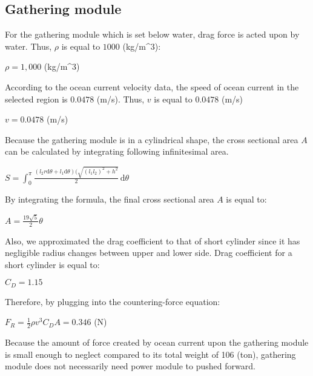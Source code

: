 \documentclass{article}
\begin{document}
\subsection{Gathering module}
For the gathering module which is set below water, drag force is acted upon by water. Thus, $\rho$ is equal to $1000$ (kg/m^3): \newline
\begin{center}
    $\rho = 1,000$ (kg/m^3)
\end{center}
\begin{flushleft}
According to the ocean current velocity data, the speed of ocean current in the selected region is $0.0478$ (m/s). Thus, $v$ is equal to $0.0478$ (m/s)
\end{flushleft}
\begin{center}
    $v = 0.0478$ (m/s)
\end{center}
\begin{flushleft}
Because the gathering module is in a cylindrical shape, the cross sectional area $A$ can be calculated by integrating following infinitesimal area.
\newline\end{flushleft}
\begin{center}
    $S=\int_0^\pi \! $$\frac{(l_2r\mathrm{d}\theta+l_1\mathrm{d}\theta)(\sqrt{(l_1 l_2)^2+h^2}}{2}$$ \, \mathrm{d}\theta$
\end{center}
By integrating the formula, the final cross sectional area $A$ is equal to: \newline
\begin{center}
    $A=$$\frac{19\sqrt{5}}{2}$$\theta$
\end{center}
\begin{flushleft}
Also, we approximated the drag coefficient to that of short cylinder since it has negligible radius changes between upper and lower side. Drag coefficient for a short cylinder is equal to:
\end{flushleft}
\begin{center}
    $C_D=1.15$
\end{center}
\begin{flushleft}
Therefore, by plugging into the countering-force equation: \newline
\end{flushleft}
\begin{center}
    $F_R=$$\frac{1}{2}$$\rho v^3 C_D A=0.346$ (N)
\end{center}
\begin{flushleft}
Because the amount of force created by ocean current upon the gathering module is small enough to neglect compared to its total weight of 106 (ton), gathering module does not necessarily need power module to pushed forward.
\end{flushleft}
\end{document}
